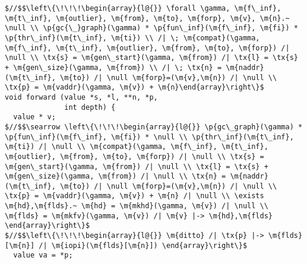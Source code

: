  
\begin{figure*}[!ht]
\vspace{-1ex}
  \begin{lstlisting}[multicols=2]
$//$$\left\{\!\!\!\begin{array}{l@{}} \forall \gamma, \m{f\_inf}, \m{t\_inf}, \m{outlier}, \m{from}, \m{to}, \m{forp}, \m{v}, \m{n}.~ \null \\ \p{gc{\_}graph}(\gamma) * \p{fun\_inf}(\m{f\_inf}, \m{fi}) * \p{thr\_inf}(\m{t\_inf}, \m{ti}) \\ /| \; \m{compat}(\gamma, \m{f\_inf}, \m{t\_inf}, \m{outlier}, \m{from}, \m{to}, \m{forp}) /| \null \\ \tx{s} = \m{gen\_start}(\gamma, \m{from}) /| \tx{l} = \tx{s} + \m{gen\_size}(\gamma, \m{from}) \\ /| \; \tx{n} = \m{naddr}(\m{t\_inf}, \m{to}) /| \null \m{forp}=(\m{v},\m{n}) /| \null \\ \tx{p} = \m{vaddr}(\gamma, \m{v}) + \m{n}\end{array}\right\}$
void forward (value *s, *l, **n, *p, 
              int depth) {
  value * v;
$//$$\searrow \left\{\!\!\!\begin{array}{l@{}} \p{gc\_graph}(\gamma) * \p{fun\_inf}(\m{f\_inf}, \m{fi}) * \null \\ \p{thr\_inf}(\m{t\_inf}, \m{ti}) /| \null \\ \m{compat}(\gamma, \m{f\_inf}, \m{t\_inf}, \m{outlier}, \m{from}, \m{to}, \m{forp}) /| \null \\ \tx{s} = \m{gen\_start}(\gamma, \m{from}) /| \null \\ \tx{l} = \tx{s} + \m{gen\_size}(\gamma, \m{from}) /| \null \\ \tx{n} = \m{naddr}(\m{t\_inf}, \m{to}) /| \null \m{forp}=(\m{v},\m{n}) /| \null \\ \tx{p} = \m{vaddr}(\gamma, \m{v}) + \m{n} /| \null \\ \exists \m{hd},\m{flds}.~ \m{hd} = \m{mkhd}(\gamma, \m{v}) /| \null \\ \m{flds} = \m{mkfv}(\gamma, \m{v}) /| \m{v} |-> \m{hd},\m{flds} \end{array}\right\}$
$//$$\left\{\!\!\!\begin{array}{l@{}} \m{ditto} /| \tx{p} |-> \m{flds}[\m{n}] /| \m{iopi}(\m{flds}[\m{n}]) \end{array}\right\}$
  value va = *p; 

\end{lstlisting}
\end{figure*}
